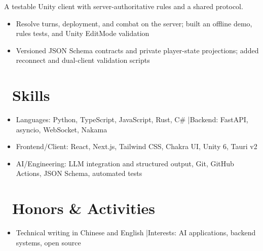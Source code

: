 \documentclass{resume}
\begin{document}
A testable Unity client with server-authoritative rules and a shared protocol.
\begin{itemize}
  \item Resolve turns, deployment, and combat on the server; built an offline demo, rules tests, and Unity EditMode validation
  \item Versioned JSON Schema contracts and private player-state projections; added reconnect and dual-client validation scripts
\end{itemize}

\section{\faCogs\ Skills}
\begin{itemize}[parsep=0.3ex]
  \item Languages: Python, TypeScript, JavaScript, Rust, C\# \quad|\quad Backend: FastAPI, asyncio, WebSocket, Nakama
  \item Frontend/Client: React, Next.js, Tailwind CSS, Chakra UI, Unity 6, Tauri v2
  \item AI/Engineering: LLM integration and structured output, Git, GitHub Actions, JSON Schema, automated tests
\end{itemize}

\section{\faHeartO\ Honors \& Activities}
\vspace{-0.3ex}
\begin{itemize}[parsep=0.3ex]
  \item Technical writing in Chinese and English \quad|\quad Interests: AI applications, backend systems, open source
\end{itemize}
\end{document}
